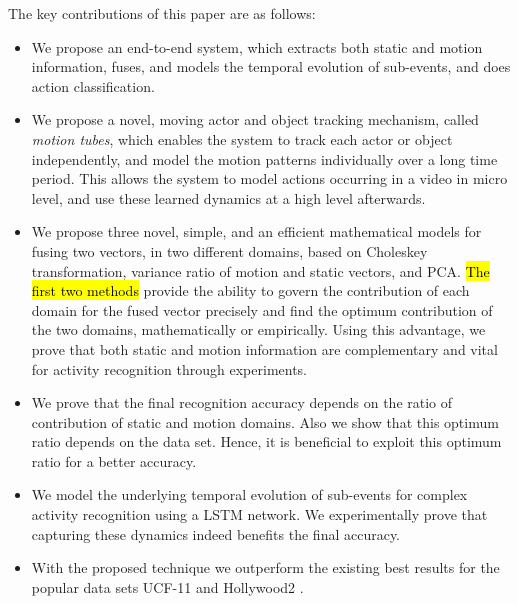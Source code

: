 The key contributions of this paper are as follows:

 \begin{itemize}
  \item We propose an end-to-end system, which  extracts both static and motion information, fuses, and models the
temporal evolution of sub-events, and does action classification.
  \item We propose a novel, moving actor and object tracking mechanism, called \textit{motion tubes},
which enables the system to track each actor or object independently, and model the motion patterns individually over a long time period.
This allows the system to model actions occurring in a video in micro level, and use these learned dynamics
at a high level afterwards.
 \item We propose three novel, simple, and an efficient mathematical models for fusing two vectors,
in two different domains, based on Choleskey transformation, variance ratio of motion and static vectors, and PCA. \hl{The first two methods} provide
the ability to govern the contribution of each domain for the fused vector precisely and find the optimum contribution of the two domains, mathematically or empirically. Using this advantage, we prove that both static and motion information are complementary and vital for activity recognition through experiments.
 \item We prove that the final recognition accuracy depends on the ratio of contribution of static and motion domains. Also we show that
 this optimum ratio depends on the data set. Hence, it is beneficial to exploit this optimum ratio for a better accuracy.
  \item We model the underlying temporal evolution of sub-events for complex activity recognition using a LSTM network. We experimentally
prove that capturing these dynamics indeed benefits the final accuracy.

\item With the proposed technique
we outperform the existing best results for the popular data sets UCF-11 \cite{liu2009recognizing}
and Hollywood2 \cite{marszalek2009actions}.
 \end{itemize}




